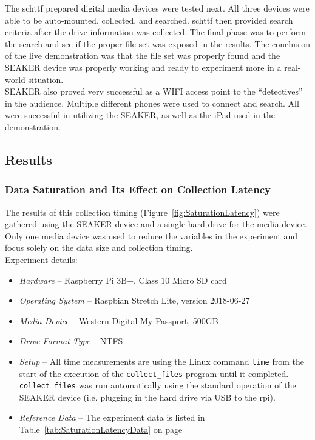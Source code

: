 \documentclass[12pt]{article}
\begin{document}
The \gls{schttf} prepared digital media devices were tested next.  All three devices
were able to be auto-mounted, collected, and searched.  \gls{schttf} then provided
search criteria after the drive information was collected.  The final phase was to perform the
search and see if the proper file set was exposed in the results.  The conclusion
of the live demonstration was that the file set was properly found and the SEAKER
device was properly working and ready to experiment more in a real-world situation.\\

SEAKER also proved very successful as a WIFI access point to the ``detectives'' in
the audience.  Multiple different phones were used to connect and search.  All were
successful in utilizing the SEAKER, as well as the iPad used in the demonstration. 

\subsection{Results}

\subsubsection{Data Saturation and Its Effect on Collection Latency}

The results of this collection timing (Figure~\ref{fig:SaturationLatency})
were gathered using the SEAKER device and a single hard drive for the media device.
Only one media device was used to reduce the variables in the experiment and focus
solely on the data size and collection timing.\\

Experiment details:

\begin{itemize}
  \item {\em Hardware} -- Raspberry Pi 3B+, Class 10 Micro SD card
  \item {\em Operating System} -- Raspbian Stretch Lite, version 2018-06-27
  \item {\em Media Device} -- Western Digital My Passport\texttrademark, 500GB
  \item {\em Drive Format Type} -- NTFS
  \item {\em Setup} -- All time measurements are using the Linux 
  command \verb|time| from the start of the execution of the \verb|collect_files|
  program until it completed.  \verb|collect_files| was run automatically
  using the standard operation of the SEAKER device (i.e. plugging in the hard
  drive via USB to the \gls{rpi}).
  \item {\em Reference Data} -- The experiment data is listed in
  Table~\ref{tab:SaturationLatencyData} on page~\pageref{tab:SaturationLatencyData}
\end{itemize}
\end{document}

